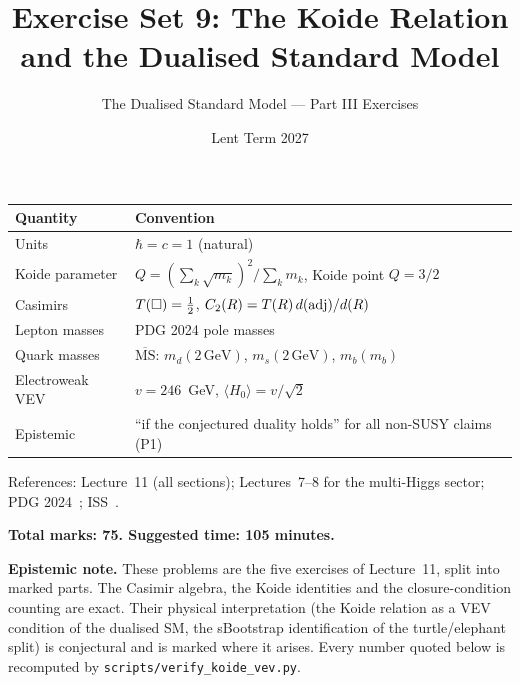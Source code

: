 \documentclass[11pt,a4paper]{article}
\title{\textbf{Exercise Set 9: The Koide Relation and the Dualised
Standard Model}}
\author{The Dualised Standard Model --- Part III Exercises}
\date{Lent Term 2027}
\begin{document}
\maketitle

\begin{conventionbox}[title={Conventions for these exercises}]
\renewcommand{\arraystretch}{1.3}
\begin{tabular}{@{}l l@{}}
\toprule
\textbf{Quantity} & \textbf{Convention} \\
\midrule
Units & $\hbar = c = 1$ (natural) \\
Koide parameter & $Q = (\sum_k \sqrt{m_k})^2/\sum_k m_k$, Koide point $Q = 3/2$ \\
Casimirs & $T(\square) = \tfrac12$, $C_2(R) = T(R)\,d(\mathrm{adj})/d(R)$ \\
Lepton masses & PDG 2024 pole masses~\cite{PDG2024} \\
Quark masses & $\overline{\text{MS}}$: $m_d(2\,\text{GeV})$, $m_s(2\,\text{GeV})$, $m_b(m_b)$~\cite{PDG2024} \\
Electroweak VEV & $v = 246$~GeV, $\langle H_0\rangle = v/\sqrt{2}$ \\
Epistemic & ``if the conjectured duality holds'' for all non-SUSY claims (P1) \\
\bottomrule
\end{tabular}

\medskip

\noindent References: Lecture~11 (all sections); Lectures~7--8 for the
multi-Higgs sector; PDG 2024~\cite{PDG2024}; ISS~\cite{ISS2006}.

\medskip

\noindent\textbf{Total marks: 75. \quad Suggested time: 105 minutes.}

\medskip

\noindent\textbf{Epistemic note.}
These problems are the five exercises of Lecture~11, split into
marked parts.  The Casimir algebra, the Koide identities and the
closure-condition counting are exact.  Their physical interpretation
(the Koide relation as a VEV condition of the dualised SM, the
sBootstrap identification of the turtle/elephant split) is conjectural
and is marked where it arises.  Every number quoted below is recomputed
by \texttt{scripts/verify\_koide\_vev.py}.
\end{conventionbox}

\bigskip


\end{document}
